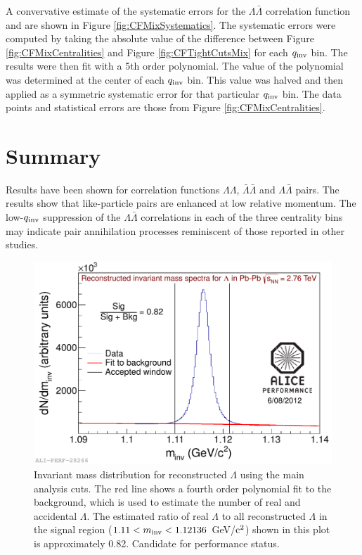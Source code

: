 A convervative estimate of the systematic errors for the $\Lambda\bar{\Lambda}$ correlation function and are shown in Figure \ref{fig:CFMixSystematics}.  The systematic errors were computed by taking the absolute value of the difference between Figure \ref{fig:CFMixCentralities} and Figure \ref{fig:CFTightCutsMix} for each $q_{\rm inv}$ bin.  The results were then fit with a 5th order polynomial.  The value of the polynomial was determined at the center of each $q_{\rm inv}$ bin.  This value was halved and then applied as a symmetric systematic error for that particular $q_{\rm inv}$ bin.  The data points and statistical errors are those from Figure \ref{fig:CFMixCentralities}.



\section{Summary}
Results have been shown for correlation functions $\Lambda\Lambda$, $\bar{\Lambda}\bar{\Lambda}$ and $\Lambda\bar{\Lambda}$ pairs.  The results show that like-particle pairs are enhanced at low relative momentum.  The low-$q_{\rm inv}$ suppression of the $\Lambda\bar{\Lambda}$ correlations in each of the three centrality bins may indicate pair annihilation processes reminiscent of those reported in other studies.

\begin{figure}[hbtp]
\includegraphics[scale=0.6]{2012-Aug-07-LamInvMass_Perf.pdf}
\caption[Invariant mass distribution for reconstructed $\Lambda$]{Invariant mass distribution for reconstructed $\Lambda$ using the main analysis cuts.  The red line shows a fourth order polynomial fit to the background, which is used to estimate the number of real and accidental $\Lambda$.  The estimated ratio of real $\Lambda$ to all reconstructed $\Lambda$ in the signal region ($ 1.11 < m_{\rm inv} < 1.12136$ GeV/${\rm c^2}$) shown in this plot is approximately 0.82.  Candidate for performance status.}
\label{fig:MassLooseCut}
\end{figure}

